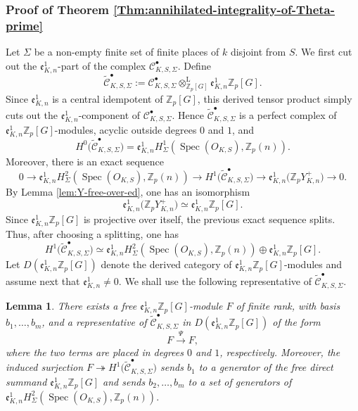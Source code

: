 \documentclass[a4paper,11pt]{article}
\newtheorem{lemma}[theorem]{Lemma}
\begin{document}
\subsubsection{Proof of Theorem \ref{Thm:annihilated-integrality-of-Theta-prime}}

Let $\Sigma$ be a non-empty finite set of finite places of $k$ disjoint from
$S$. We first cut out the $\mathfrak e^1_{K,n}$-part of the complex
$\mathcal C_{K,S,\Sigma}^{\bullet}$. Define
\[
\widetilde{\mathcal C}_{K,S,\Sigma}^{\bullet}
:=
\mathcal C_{K,S,\Sigma}^{\bullet}
\otimes_{\mathbb Z_p[G]}^{\mathrm L}
\mathfrak e^1_{K,n}\mathbb Z_p[G].
\]
Since $\mathfrak e^1_{K,n}$ is a central idempotent of $\mathbb Z_p[G]$, this
derived tensor product simply cuts out the $\mathfrak e^1_{K,n}$-component of
$\mathcal C_{K,S,\Sigma}^{\bullet}$. Hence
$\widetilde{\mathcal C}_{K,S,\Sigma}^{\bullet}$ is a perfect complex of
$\mathfrak e^1_{K,n}\mathbb Z_p[G]$-modules, acyclic outside degrees $0$ and
$1$, and
\[
H^0\bigl(\widetilde{\mathcal C}_{K,S,\Sigma}^{\bullet}\bigr)
=
\mathfrak e^1_{K,n}
H^1_{\Sigma}(\operatorname{Spec}(O_{K,S}),\mathbb Z_p(n)).
\]
Moreover, there is an exact sequence
\[
0
\longrightarrow
\mathfrak e^1_{K,n}
H^2_{\Sigma}(\operatorname{Spec}(O_{K,S}),\mathbb Z_p(n))
\longrightarrow
H^1\bigl(\widetilde{\mathcal C}_{K,S,\Sigma}^{\bullet}\bigr)
\longrightarrow
\mathfrak e^1_{K,n}
\bigl(\mathbb{Z}_pY_{K,n}^{+}\bigr)
\longrightarrow
0.
\]
By Lemma \ref{lem:Y-free-over-ed}, one has an isomorphism
\[
\mathfrak e^1_{K,n}
\bigl(\mathbb{Z}_pY_{K,n}^{+}\bigr)
\simeq
\mathfrak e^1_{K,n}\mathbb Z_p[G].
\]
Since $\mathfrak e^1_{K,n}\mathbb Z_p[G]$ is projective over itself, the
previous exact sequence splits. Thus, after choosing a splitting, one has
\[
H^1\bigl(\widetilde{\mathcal C}_{K,S,\Sigma}^{\bullet}\bigr)
\simeq
\mathfrak e^1_{K,n}
H^2_{\Sigma}(\operatorname{Spec}(O_{K,S}),\mathbb Z_p(n))
\oplus
\mathfrak e^1_{K,n}\mathbb Z_p[G].
\]
Let $D(\mathfrak e^1_{K,n}\mathbb Z_p[G])$ denote the derived category of $\mathfrak e^1_{K,n}\mathbb Z_p[G]$-modules and assume next that
\(\mathfrak e^1_{K,n}\neq 0\). We shall use the following representative of
$\widetilde{\mathcal C}_{K,S,\Sigma}^{\bullet}$.

\begin{lemma}
\label{lem:quadratic-representative-Sigma-cutout}
There exists a free $\mathfrak e^1_{K,n}\mathbb Z_p[G]$-module $F$ of finite
rank, with basis $b_1,\ldots,b_m$, and a representative of
$\widetilde{\mathcal C}_{K,S,\Sigma}^{\bullet}$ in
$D(\mathfrak e^1_{K,n}\mathbb Z_p[G])$ of the form
\[
F
\stackrel{\Psi}{\longrightarrow}
F,
\]
where the two terms are placed in degrees $0$ and $1$, respectively. Moreover,
the induced surjection
\(
F
\twoheadrightarrow
H^1\bigl(\widetilde{\mathcal C}_{K,S,\Sigma}^{\bullet}\bigr)
\)
sends $b_1$ to a generator of the free direct summand
\(
\mathfrak e^1_{K,n}\mathbb Z_p[G]
\)
and sends $b_2,\ldots,b_m$ to a set of generators of
\(
\mathfrak e^1_{K,n}
H^2_{\Sigma}(\operatorname{Spec}(O_{K,S}),\mathbb Z_p(n)).
\)
\end{lemma}
\end{document}
